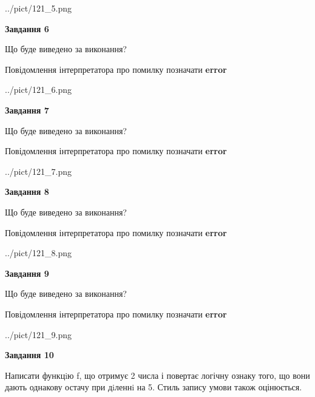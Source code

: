 \documentclass[12pt, ukrainian]{article}
\begin{document}
{\begin {large}
\begin{center}
	{../pict/121_5.png}
\end{center}
\newpage

{\begin {center}\textbf{Завдання 6}\end {center}}\par
Що буде виведено за виконання? \par
Повідомлення інтерпретатора про помилку позначати \textbf{error}

\begin{center}
	{../pict/121_6.png}
\end{center}
\newpage

{\begin {center}\textbf{Завдання 7}\end {center}}\par
Що буде виведено за виконання? \par
Повідомлення інтерпретатора про помилку позначати \textbf{error}

\begin{center}
	{../pict/121_7.png}
\end{center}
\newpage

{\begin {center}\textbf{Завдання 8}\end {center}}\par
Що буде виведено за виконання? \par
Повідомлення інтерпретатора про помилку позначати \textbf{error}

\begin{center}
	{../pict/121_8.png}
\end{center}
\newpage

{\begin {center}\textbf{Завдання 9}\end {center}}\par
Що буде виведено за виконання? \par
Повідомлення інтерпретатора про помилку позначати \textbf{error}

\begin{center}
	{../pict/121_9.png}
\end{center}
\newpage

{\begin {center}\textbf{Завдання 10}\end {center}}\par

Написати функцiю f, що отримує 2 числа і повертає логічну ознаку того, що вони дають однакову остачу при дiленнi на 5. Стиль запису умови також оцінюється.\par
\newpage

\end {large}}
\end{document}
